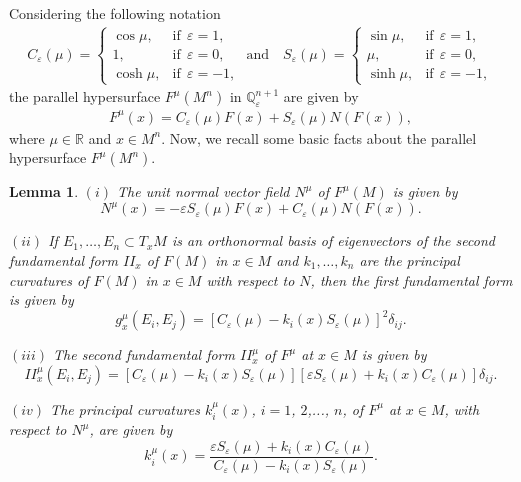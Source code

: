 \documentclass[11pt,a4paper,reqno]{amsproc}
\numberwithin{equation}{section}
\newtheorem{lemma}[theorem]{\bf Lemma}
\newcommand{\R}{\mathbb{R}}
\newcommand{\qe}{\mathbb {Q}^{n+1}_{\varepsilon}}
\begin{document}
Considering the following notation
\begin{eqnarray}\label{eq.p3}
C_{\varepsilon}(\mu)= \left\{\begin{array}{ll}
\cos \mu,	& \mbox{if} ~~ \varepsilon = 1, \\ 
1,	& \mbox{if} ~~ \varepsilon = 0, \\
\cosh \mu,	& \mbox{if} ~~ \varepsilon = -1,
\end{array} 
\right. 
\mbox{ and ~~} 
S_{\varepsilon}(\mu)= \left\{\begin{array}{ll}
\sin \mu,	& \mbox{if} ~~ \varepsilon = 1, \\ 
\mu,	& \mbox{if} ~~ \varepsilon = 0, \\
\sinh \mu,	& \mbox{if} ~~ \varepsilon = -1, 
\end{array} 
\right.  
\end{eqnarray}
 the parallel hypersurface $F^\mu(M^{n})$ in $\qe$ are given by 
\begin{eqnarray}\label{eq.p4}
F^\mu (x)=	C_{\varepsilon}(\mu)F(x)+S_{\varepsilon}(\mu)N(F(x)),
\end{eqnarray}
where $\mu \in \R$ and $x \in M^{n}$. Now, we recall some basic facts about the parallel hypersurface $F^\mu(M^{n})$.

\begin{lemma}\label{res.4}
\noindent $(i)$ The unit normal vector field $ {N}^{\mu}$ of $F^\mu (M)$ is given by
\[
 {N}^{\mu}(x)=-\varepsilon S_\varepsilon(\mu)F(x)+C_\varepsilon(\mu)N(F(x)). \]

\noindent $(ii)$ If $E_{1},\ldots, E_{n} \subset T_{x}M$ is an orthonormal basis of eigenvectors of the second fundamental form $II_{x}$ of $F(M)$ in $x \in M$ and $k_{1},\ldots, k_{n}$ are the principal curvatures of $F(M)$ in $x \in M$ with respect to $N$, then the first fundamental form is given by 
\[
{g}^{\mu}_{x}(E_{i},E_{j})=\left[C_\varepsilon(\mu)-k_{i}(x) S_\varepsilon(\mu)\right]^{2} \delta_{ij}.  \nonumber
\]

\noindent $(iii)$ The second fundamental form ${II}^{\mu}_{x}$ of $F^\mu$ at $x \in M$ is given by
\[
{II}^{\mu}_{x}(E_{i},E_{j})=\left[C_\varepsilon(\mu)-k_{i}(x) S_\varepsilon(\mu)\right] \left[\varepsilon S_\varepsilon(\mu)+k_{i}(x) C_\varepsilon(\mu)\right] \delta_{ij}. 
\]

\noindent $(iv)$  The principal curvatures ${k}_{i}^{\mu}(x)$, $i=1$, $2$,..., $n$, of $F^\mu$ at $x \in M$, with respect to ${N}^{\mu}$, are given by
\[
{k}_{i}^{\mu}(x)=\frac{\varepsilon S_{\varepsilon}(\mu)+k_{i}(x)C_{\varepsilon}(\mu)}{C_{\varepsilon}(\mu)-k_{i}(x)S_{\varepsilon}(\mu)}.
 \]
\end{lemma}
\end{document}
